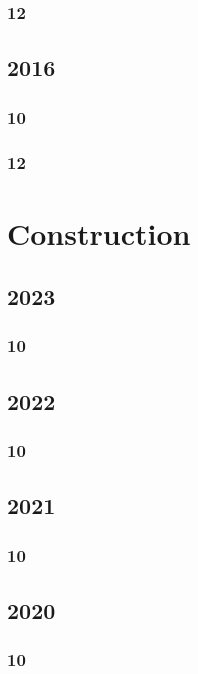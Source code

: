 \documentclass[11pt]{book}
\begin{document}
\subsection{12}





\section{2016}
\subsection{10}

\subsection{12}

   




\chapter{Construction}
\section{2023}
\subsection{10}

\section{2022}
\subsection{10}

\section{2021}
\subsection{10}

\section{2020}
\subsection{10}

\end{document}
